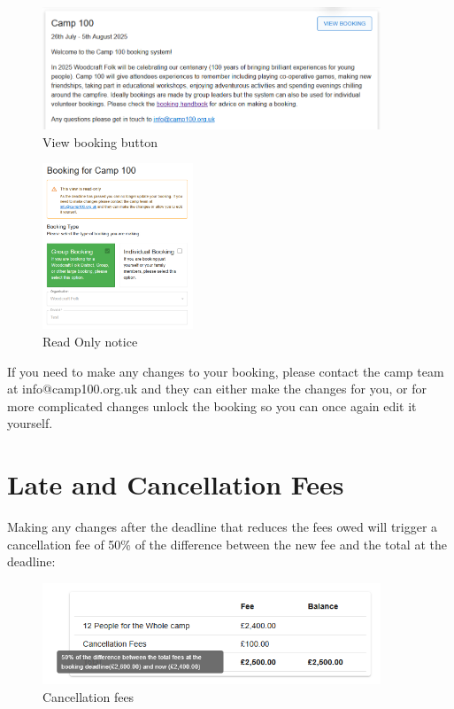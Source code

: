 \documentclass[a4paper, 11pt]{report}
\begin{document}
\begin{figure}[H]
    \centering
    \includegraphics[width=0.9\textwidth]{assets/abd-viewbooking.png}
    \caption{View booking button}
\end{figure}


\begin{figure}[H]
    \centering
    \includegraphics[width=0.4\textwidth]{assets/abd-readonly.png}
    \caption{Read Only notice}
\end{figure}


If you need to make any changes to your booking, please contact the camp team at info@camp100.org.uk and they can either make the changes for you, or for more complicated changes unlock the booking so you can once again edit it yourself.

\section{Late and Cancellation Fees}
Making any changes after the deadline that reduces the fees owed will trigger a cancellation fee of 50\% of the difference between the new fee and the total at the deadline:

\begin{figure}[H]
    \centering
    \includegraphics[width=0.9\textwidth]{assets/abd-fees.png}
    \caption{Cancellation fees}
\end{figure}
\end{document}
